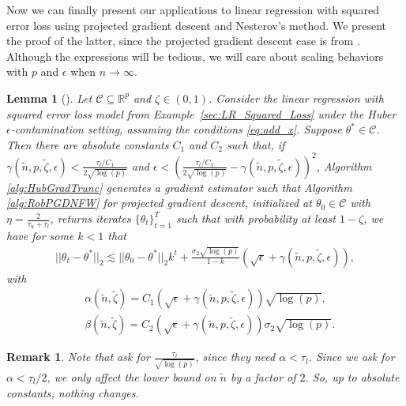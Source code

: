 \documentclass{article}
\newtheorem{lemma}{Lemma}
\newtheorem{remark}{\textbf{Remark}}
\begin{document}
Now we can finally present our applications to linear regression with squared error loss using projected gradient descent and Nesterov's method. We present the proof of the latter, since the projected gradient descent case is from \cite{RE}. Although the expressions will be tedious, we will care about scaling behaviors with $p$ and $\epsilon$ when $n \rightarrow \infty$.

\begin{lemma}[\cite{RE}]\label{lemma:Hu_eps_PGD}
Let $\mathcal{C} \subseteq \mathbb{R}^p$ and $\zeta \in (0, 1)$. Consider the linear regression with squared error loss model from Example~\ref{sec:LR_Squared_Loss} under the Huber $\epsilon$-contamination setting, assuming the conditions \eqref{eq:add_x}. Suppose $\theta^* \in \mathcal{C}$. Then there are absolute constants $C_1$ and $C_2$ such that, if $\gamma(\widetilde{n}, p, \widetilde{\zeta}, \epsilon) < \frac{\tau_l/C_1}{2\sqrt{\log(p)}}$ and $\epsilon < \left(\frac{\tau_l/C_1}{2\sqrt{\log(p)}} - \gamma(\widetilde{n}, p, \widetilde{\zeta}, \epsilon)\right)^2$, Algorithm \ref{alg:HubGradTrunc} generates a gradient estimator such that Algorithm \ref{alg:RobPGDNFW} for projected gradient descent, initialized at $\theta_0 \in \mathcal{C}$ with $\eta = \frac{2}{\tau_u + \tau_l}$, returns iterates $\{\theta_t\}_{t = 1}^T$ such that with probability at least $1 - \zeta$, we have for some $k < 1$ that
\begin{align}
\label{eq:glmreshubGD}
||\theta_t - \theta^*||_2 \lesssim||\theta_0 - \theta^*||_2k^t + \frac{\sigma_2\sqrt{\log(p)}}{1 - k}(\sqrt{\epsilon} + \gamma(\widetilde{n}, p, \widetilde{\zeta}, \epsilon)),
\end{align}
with
\begin{align*}
&\alpha(\widetilde{n}, \widetilde{\zeta}) = C_1(\sqrt{\epsilon} + \gamma(\widetilde{n}, p, \widetilde{\zeta}, \epsilon))\sqrt{\log(p)},\\
&\beta(\widetilde{n}, \widetilde{\zeta}) = C_2(\sqrt{\epsilon} + \gamma(\widetilde{n}, p, \widetilde{\zeta}, \epsilon))\sigma_2\sqrt{\log(p)}.
\end{align*}
\end{lemma}

\begin{remark}
Note that \cite{RE} ask for $\frac{\tau_l}{\sqrt{\log(p)}}$, since they need $\alpha < \tau_l$. Since we ask for $\alpha < \tau_l/2$, we only affect the lower bound on $\widetilde{n}$ by a factor of $2$. So, up to absolute constants, nothing changes.
\end{remark}
\end{document}
